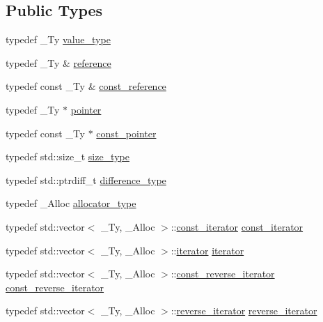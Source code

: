 \subsection*{Public Types}
\begin{DoxyCompactItemize}
\item 
typedef \+\_\+\+Ty \hyperlink{classcrsc_1_1dynamic__r3__tensor_ad7fb44388c819fb7947771da18bb625b}{value\+\_\+type}
\item 
typedef \+\_\+\+Ty \& \hyperlink{classcrsc_1_1dynamic__r3__tensor_a1a4d3cf01c93ee5b24b927236b1fd4b1}{reference}
\item 
typedef const \+\_\+\+Ty \& \hyperlink{classcrsc_1_1dynamic__r3__tensor_a5dd99c21cd4dc396a2ae225f90301cdc}{const\+\_\+reference}
\item 
typedef \+\_\+\+Ty $\ast$ \hyperlink{classcrsc_1_1dynamic__r3__tensor_af0ce0fb7d1d534ab625b1cdc8ae56b8a}{pointer}
\item 
typedef const \+\_\+\+Ty $\ast$ \hyperlink{classcrsc_1_1dynamic__r3__tensor_afb88e84aba287b3b787b6d031c2c862e}{const\+\_\+pointer}
\item 
typedef std\+::size\+\_\+t \hyperlink{classcrsc_1_1dynamic__r3__tensor_a00e5f1f46f16d0c0ac1cffa6bd0fe862}{size\+\_\+type}
\item 
typedef std\+::ptrdiff\+\_\+t \hyperlink{classcrsc_1_1dynamic__r3__tensor_a28411e1e72a5f01ff3b18f8e80d16729}{difference\+\_\+type}
\item 
typedef \+\_\+\+Alloc \hyperlink{classcrsc_1_1dynamic__r3__tensor_af537557b80397a63ad30f77ba9660a22}{allocator\+\_\+type}
\item 
typedef std\+::vector$<$ \+\_\+\+Ty, \+\_\+\+Alloc $>$\+::\hyperlink{classcrsc_1_1dynamic__r3__tensor_a8e4bf09063232b58e5ae3b1a135fdff5}{const\+\_\+iterator} \hyperlink{classcrsc_1_1dynamic__r3__tensor_a8e4bf09063232b58e5ae3b1a135fdff5}{const\+\_\+iterator}
\item 
typedef std\+::vector$<$ \+\_\+\+Ty, \+\_\+\+Alloc $>$\+::\hyperlink{classcrsc_1_1dynamic__r3__tensor_a8da8f1c3ec1cde63d7693e41c9e7f496}{iterator} \hyperlink{classcrsc_1_1dynamic__r3__tensor_a8da8f1c3ec1cde63d7693e41c9e7f496}{iterator}
\item 
typedef std\+::vector$<$ \+\_\+\+Ty, \+\_\+\+Alloc $>$\+::\hyperlink{classcrsc_1_1dynamic__r3__tensor_afed2f011951ec314926ef9368aae848a}{const\+\_\+reverse\+\_\+iterator} \hyperlink{classcrsc_1_1dynamic__r3__tensor_afed2f011951ec314926ef9368aae848a}{const\+\_\+reverse\+\_\+iterator}
\item 
typedef std\+::vector$<$ \+\_\+\+Ty, \+\_\+\+Alloc $>$\+::\hyperlink{classcrsc_1_1dynamic__r3__tensor_acc9533d771b0b766874a6c984bc3a31a}{reverse\+\_\+iterator} \hyperlink{classcrsc_1_1dynamic__r3__tensor_acc9533d771b0b766874a6c984bc3a31a}{reverse\+\_\+iterator}
\end{DoxyCompactItemize}
